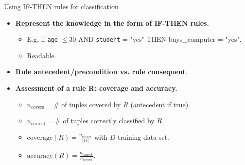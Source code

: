 \documentclass[aspectratio=169,t,table]{beamer}
\begin{document}
  {
    \begin{frame}{Using \uppercase{if-then} rules for classification}
      \begin{itemize}
        \item \textbf{Represent the knowledge in the form of {\color{airforceblue}IF-THEN rules}.}
        \begin{itemize}
          \item E.g. if \texttt{age} $\leq 30$ AND \texttt{student} = "yes" THEN buys\_computer = "yes".
          \item Readable.
        \end{itemize}
        \item \textbf{Rule {\color{airforceblue}antecedent/precondition} vs. rule {\color{airforceblue}consequent}}.
        \item \textbf{Assessment of a rule R: coverage and accuracy.}
        \begin{itemize}
          \item $n_{\text{covers}} = \#$ of tuples covered by $R$ (antecedent if true).
          \item $n_{\text{correct}} = \#$ of tuples correctly classified by $R$.
          \item $\text{coverage}(R) = \frac{n_{\text{covers}}}{|D|}$ with $D$ training data set.
          \item $\text{accuracy}(R) = \frac{n_{\text{correct}}}{n_{\text{covers}}}$.
        \end{itemize}
      \end{itemize}
    \end{frame}
  }
\end{document}

